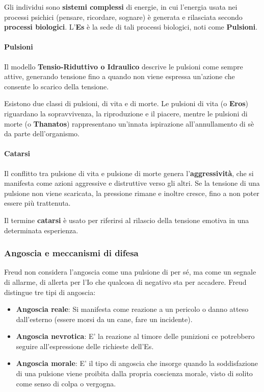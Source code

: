 \documentclass{subfiles}
\begin{document}
Gli individui sono \textbf{sistemi complessi} di energie, in cui l'energia usata nei processi 
psichici (pensare, ricordare, sognare) è generata e rilasciata secondo \textbf{processi biologici}. L'\textbf{Es} è la sede di tali processi biologici, noti come \textbf{Pulsioni}.

\paragraph*{Pulsioni}
Il modello \textbf{Tensio-Riduttivo o Idraulico} descrive le pulsioni come sempre attive, generando 
tensione fino a quando non viene espressa un'azione che consente lo scarico della tensione.

Esistono due classi di pulsioni, di vita e di morte. Le pulsioni di vita (o \textbf{Eros}) 
riguardano la sopravvivenza, la riproduzione e il piacere, mentre le pulsioni di morte 
(o \textbf{Thanatos}) rappresentano un'innata ispirazione all'annullamento di sè da parte 
dell'organismo.\\

\paragraph*{Catarsi}
Il conflitto tra pulsione di vita e pulsione di morte genera l'\textbf{aggressività}, che si 
manifesta come azioni aggressive e distruttive verso gli altri. 
Se la tensione di una pulsione non viene scaricata, la pressione rimane e inoltre cresce, fino a 
non poter essere più trattenuta.

Il termine \textbf{catarsi} è usato per riferirsi al rilascio della tensione emotiva in una 
determinata esperienza.\\

\subsubsection{Angoscia e meccanismi di difesa}
Freud non considera l'angoscia come una pulsione di per sé, ma come un segnale di allarme, di 
allerta per l'Io che qualcosa di negativo sta per accadere.
Freud distingue tre tipi di angoscia: 

\begin{itemize}
    \item \textbf{Angoscia reale}: Si manifesta come reazione a un pericolo o danno atteso 
    dall'esterno (essere morsi da un cane, fare un incidente).
    \item \textbf{Angoscia nevrotica}: E' la reazione al timore delle punizioni ce potrebbero 
    seguire all'espressione delle richieste dell'Es. 
    \item \textbf{Angoscia morale}: E' il tipo di angoscia che insorge quando la soddisfazione 
    di una pulsione viene proibita dalla propria coscienza morale, visto di solito come senso 
    di colpa o vergogna.
\end{itemize}
\end{document}
